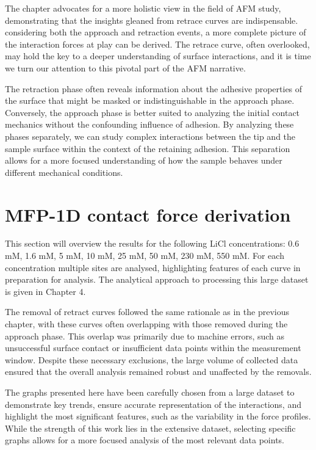 The chapter advocates for a more holistic view in the field of AFM study, demonstrating that the insights gleaned from retrace curves are indispensable. considering both the approach and retraction events, a more complete picture of the interaction forces at play can be derived. The retrace curve, often overlooked, may hold the key to a deeper understanding of surface interactions, and it is time we turn our attention to this pivotal part of the AFM narrative.

The retraction phase often reveals information about the adhesive properties of the surface that might be masked or indistinguishable in the approach phase. Conversely, the approach phase is better suited to analyzing the initial contact mechanics without the confounding influence of adhesion. By analyzing these phases separately, we can study complex interactions between the tip and the sample surface within the context of the retaining adhesion. This separation allows for a more focused understanding of how the sample behaves under different mechanical conditions. \cite{BUTT20051}

\section{MFP-1D contact force derivation}

This section will overview the results for the following LiCl concentrations: 0.6 mM, 1.6 mM, 5 mM, 10 mM, 25 mM, 50 mM, 230 mM, 550 mM. For each concentration multiple sites are analysed, highlighting features of each curve in preparation for analysis. The analytical approach to processing this large dataset is given in Chapter 4. 

The removal of retract curves followed the same rationale as in the previous chapter, with these curves often overlapping with those removed during the approach phase. This overlap was primarily due to machine errors, such as unsuccessful surface contact or insufficient data points within the measurement window. Despite these necessary exclusions, the large volume of collected data ensured that the overall analysis remained robust and unaffected by the removals.

The graphs presented here have been carefully chosen from a large dataset to demonstrate key trends, ensure accurate representation of the interactions, and highlight the most significant features, such as the variability in the force profiles. While the strength of this work lies in the extensive dataset, selecting specific graphs allows for a more focused analysis of the most relevant data points.

